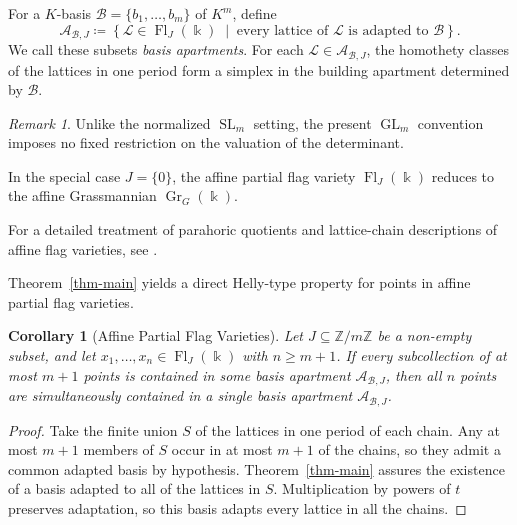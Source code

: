 \documentclass[12pt]{amsart}
\newtheorem{cor}[theorem]{Corollary}
\theoremstyle{definition}
\theoremstyle{remark}
\newtheorem{rmk}[theorem]{Remark}
\begin{document}
For a $K$-basis $\mathcal B=\{b_1,\ldots,b_m\}$ of $K^m$, define
\[
  \mathcal A_{\mathcal B,J}
  \coloneqq
  \left\{
    \mathcal L\in\operatorname{Fl}_J(\Bbbk)
    \;\middle|\;
    \text{every lattice of $\mathcal L$ is adapted to $\mathcal B$}
  \right\}.
\]
We call these subsets \emph{basis apartments}.
For each $\mathcal L\in\mathcal A_{\mathcal B,J}$,
the homothety classes of the lattices in one period form
a simplex in the building apartment determined by
$\mathcal B$.

\begin{rmk}
    Unlike the normalized $\operatorname{SL}_m$ setting, the present $\operatorname{GL}_m$ convention imposes no fixed restriction on the valuation of the determinant.
\end{rmk}

In the special case $J = \{0\}$, the affine partial flag variety $\operatorname{Fl}_J(\Bbbk)$ reduces to the affine Grassmannian $\operatorname{Gr}_G(\Bbbk)$.


For a detailed treatment of parahoric quotients and lattice-chain descriptions of affine flag varieties, see \cite[Sections~2.1.6--2.1.7]{Yun17}. 





Theorem~\ref{thm-main} yields a direct Helly-type property for points in affine partial flag varieties.

\begin{cor}[Affine Partial Flag Varieties]
\label{cor:affine-flag-helly}
Let $J \subseteq \mathbb{Z}/m\mathbb{Z}$ be a non-empty subset, and let $x_1, \dots, x_n \in \operatorname{Fl}_J(\Bbbk)$ with $n \ge m+1$. If every subcollection of at most $m+1$ points is contained in some basis apartment $\mathcal{A}_{\mathcal{B}, J}$, then all $n$ points are simultaneously contained in a single basis apartment $\mathcal{A}_{\mathcal{B}, J}$.
\end{cor}

\begin{proof}
Take the finite union $S$ of the lattices in one period
of each chain. Any at most $m+1$ members of $S$ occur
in at most $m+1$ of the chains, so they admit a common
adapted basis by hypothesis. Theorem~\ref{thm-main}
assures the existence of a basis adapted to all of the lattices in $S$. Multiplication by
powers of $t$ preserves adaptation, so this basis adapts
every lattice in all the chains.
\end{proof}
\end{document}
